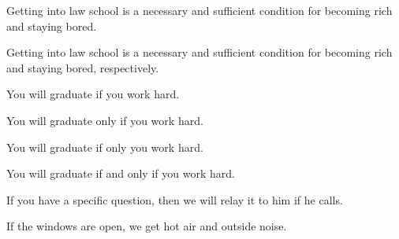 \begin{enumerate}
\begin{statement}{Getting into law school is a necessary and sufficient condition for becoming rich and staying bored.}
\end{statement}

\begin{statement}{Getting into law school is a necessary and sufficient condition for becoming rich and staying bored, respectively.}
\end{statement}

\begin{statement}{You will graduate if you work hard.}
\end{statement}

\begin{statement}{You will graduate only if you work hard.}
\end{statement}

\begin{statement}{You will graduate if only you work hard.}
\end{statement}

\begin{statement}{You will graduate if and only if you work hard.}
\end{statement}

\begin{statement}{If you have a specific question, then we will relay it to him if he calls.}
\end{statement}

\begin{statement}{If the windows are open, we get hot air and outside noise.}
\end{statement}


\end{enumerate}
